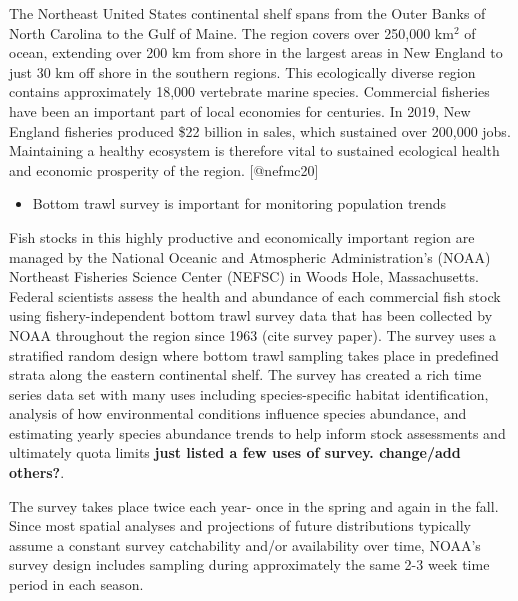 \documentclass[
]{article}
\providecommand{\tightlist}{%
  \setlength{\itemsep}{0pt}\setlength{\parskip}{0pt}}
\begin{document}
The Northeast United States continental shelf spans from the Outer Banks of North Carolina to the Gulf of Maine. The region covers over 250,000 km\(^2\) of ocean, extending over 200 km from shore in the largest areas in New England to just 30 km off shore in the southern regions. This ecologically diverse region contains approximately 18,000 vertebrate marine species. Commercial fisheries have been an important part of local economies for centuries. In 2019, New England fisheries produced \$22 billion in sales, which sustained over 200,000 jobs. Maintaining a healthy ecosystem is therefore vital to sustained ecological health and economic prosperity of the region. {[}@nefmc20{]}

\begin{itemize}
\tightlist
\item
  Bottom trawl survey is important for monitoring population trends
\end{itemize}

Fish stocks in this highly productive and economically important region are managed by the National Oceanic and Atmospheric Administration's (NOAA) Northeast Fisheries Science Center (NEFSC) in Woods Hole, Massachusetts. Federal scientists assess the health and abundance of each commercial fish stock using fishery-independent bottom trawl survey data that has been collected by NOAA throughout the region since 1963 (cite survey paper). The survey uses a stratified random design where bottom trawl sampling takes place in predefined strata along the eastern continental shelf. The survey has created a rich time series data set with many uses including species-specific habitat identification, analysis of how environmental conditions influence species abundance, and estimating yearly species abundance trends to help inform stock assessments and ultimately quota limits \textbf{just listed a few uses of survey. change/add others?}.

The survey takes place twice each year- once in the spring and again in the fall. Since most spatial analyses and projections of future distributions typically assume a constant survey catchability and/or availability over time, NOAA's survey design includes sampling during approximately the same 2-3 week time period in each season.
\end{document}
